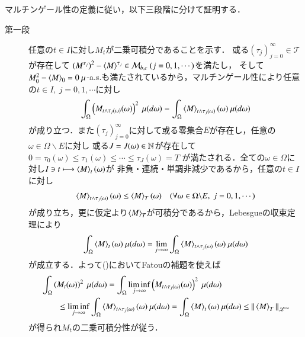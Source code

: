 	\begin{prf} マルチンゲール性の定義に従い，以下三段階に分けて証明する．
		\begin{description}
			\item[第一段] 任意の$t \in I$に対し$M_t$が二乗可積分であることを示す．
				或る$(\tau_j)_{j=0}^{\infty} \in \mathcal{T}$が存在して
				$\left(M^{\tau_j} \right)^2 - \inprod<M>^{\tau_j} \in \mathcal{M}_{b,c}\ (j=0,1,\cdots)$を満たし，
				そして$M^2_0 - \inprod<M>_0 = 0\ \mu$-a.s.も満たされているから，マルチンゲール性により任意の$t \in I,\ j=0,1,\cdots$に対し
				\begin{align}
					\int_\Omega \left( M_{t \wedge \tau_j(\omega)}(\omega) \right)^2\ \mu(d\omega)
					= \int_\Omega \inprod<M>_{t \wedge \tau_j(\omega)}(\omega)\ \mu(d\omega)
					\label{thm:thm_quadratic_variation_bounded_then_M_2c_1}
				\end{align}
				が成り立つ．また$(\tau_j)_{j=0}^{\infty}$に対して或る零集合$E$が存在し，任意の$\omega \in \Omega \backslash E$に対し
				或る$J = J(\omega) \in \mathbb{N}$が存在して
				$0 = \tau_0(\omega) \leq \tau_1(\omega) \leq \cdots \leq \tau_{J}(\omega) = T$
				が満たされる．全ての$\omega \in \Omega$に対し$I \ni t \longmapsto \inprod<M>_t(\omega)$が
				非負・連続・単調非減少であるから，任意の$t \in I$に対し
				\begin{align}
					\inprod<M>_{t \wedge \tau_j(\omega)}(\omega) \leq \inprod<M>_T(\omega)
					\quad (\forall \omega \in \Omega \backslash E,\ j=0,1,\cdots)
				\end{align}
				が成り立ち，更に仮定より$\inprod<M>_T$が可積分であるから，Lebesgueの収束定理により
				\begin{align}
					\int_\Omega \inprod<M>_t(\omega)\ \mu(d\omega)
					= \lim_{j \to \infty} \int_\Omega \inprod<M>_{t \wedge \tau_j(\omega)}(\omega)\ \mu(d\omega)
				\end{align}
				が成立する．よって()においてFatouの補題を使えば
				\begin{align}
					&\int_\Omega \left( M_t(\omega) \right)^2\ \mu(d\omega)
					= \int_\Omega \liminf_{j \to \infty} \left( M_{t \wedge \tau_j(\omega)}(\omega) \right)^2\ \mu(d\omega) \\
					&\qquad \leq \liminf_{j \to \infty} \int_\Omega \inprod<M>_{t \wedge \tau_j(\omega)}(\omega)\ \mu(d\omega)
					= \int_\Omega \inprod<M>_t(\omega)\ \mu(d\omega)
					\leq \Norm{\inprod<M>_T}{\mathscr{L}^{\infty}}
				\end{align}
				が得られ$M_t$の二乗可積分性が従う．
			

\end{description}
\end{prf}
